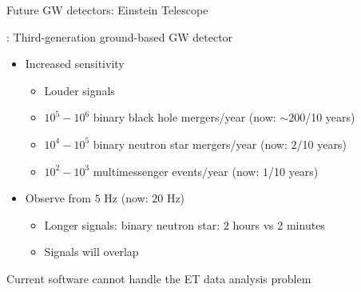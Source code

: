 \documentclass[usenames,dvipsnames,t]{beamer}
\begin{document}
\begin{frame}{Future GW detectors: Einstein Telescope}
  \def\x{3mm}
  \def\y{2mm}
  \def\z{1mm}

  : Third-generation ground-based GW detector~\cite{ET:2019dnz, Abac:2025saz}
  \begin{itemize}
    \item<2-> Increased sensitivity
    
    \begin{itemize}
      \item Louder signals
      
      \vspace{\z}

      \item $10^{5} - 10^{6}$ binary black hole mergers/year (now: $\sim 200$/10 years)
      
      \vspace{\z}
      
      \item $10^{4} - 10^{5}$ binary neutron star mergers/year (now: $2$/10 years)

      \vspace{\z}
      
      \item $10^{2} - 10^{3}$ multimessenger events/year (now: $1$/10 years)
    \end{itemize}

    \vspace{\y}

    \item<3-> Observe from $5$ Hz (now: $20$ Hz)
    \begin{itemize}
      \item Longer signals: binary neutron star: $2$ hours vs 2 minutes 
      \item Signals will overlap
    \end{itemize}
  \end{itemize}

  \vspace{4mm}

  \begin{tcolorbox}[colback=red!10!white, colframe=red!80!black, coltext=black]
  Current software cannot handle the ET data analysis problem~\cite{Hu:2024mvn}
  \end{tcolorbox}
\end{frame}

\end{document}
